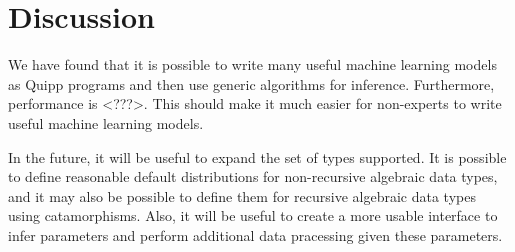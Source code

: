 \documentclass{article}
\begin{document}
  \section{Discussion}

  We have found that it is possible to write many useful machine learning models as Quipp programs and then use generic algorithms for inference.  Furthermore, performance is <???>.  This should make it much easier for non-experts to write useful machine learning models.
  
  In the future, it will be useful to expand the set of types supported.  It is possible to define reasonable default distributions for non-recursive algebraic data types, and it may also be possible to define them for recursive algebraic data types using catamorphisms.  Also, it will be useful to create a more usable interface to infer parameters and perform additional data pracessing given these parameters.

{}

\end{document}
